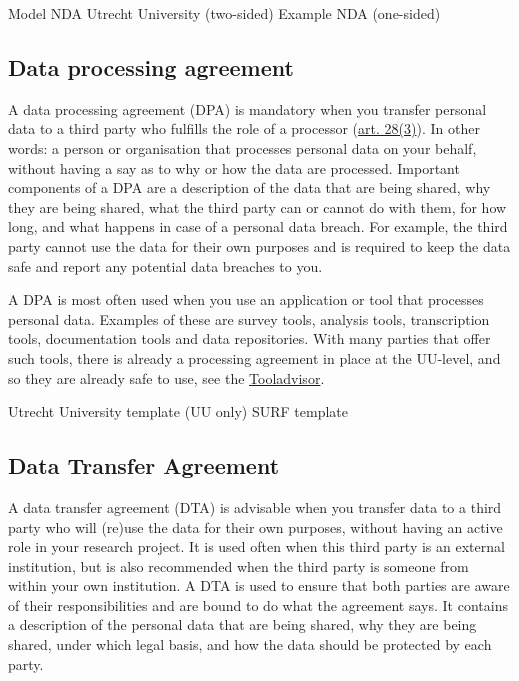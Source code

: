 \documentclass[
]{book}
\begin{document}
Model NDA Utrecht University (two-sided)
Example NDA (one-sided)

\hypertarget{data-processing-agreement}{%
\subsection{Data processing agreement}\label{data-processing-agreement}}

A data processing agreement (DPA) is mandatory when you transfer personal data
to a third party who fulfills the role of a processor
(\href{https://gdpr-info.eu/art-28-gdpr/}{art. 28(3)}).
In other words: a person or organisation that processes personal data on your
behalf, without having a say as to why or how the data are processed. Important
components of a DPA are a description of the data that are being shared, why
they are being shared, what the third party can or cannot do with them, for how
long, and what happens in case of a personal data breach. For example, the third
party cannot use the data for their own purposes and is required to keep the
data safe and report any potential data breaches to you.

A DPA is most often used when you use an application or tool that processes
personal data. Examples of these are survey tools, analysis tools, transcription
tools, documentation tools and data repositories. With many parties that offer
such tools, there is already a processing agreement in place at the UU-level,
and so they are already safe to use, see the
\href{https://tools.uu.nl/}{Tooladvisor}.

Utrecht University template (UU only)
SURF template

\hypertarget{data-transfer-agreement}{%
\subsection{Data Transfer Agreement}\label{data-transfer-agreement}}

A data transfer agreement (DTA) is advisable when you transfer data to a third
party who will (re)use the data for their own purposes, without having an
active role in your research project. It is used often when this third party is
an external institution, but is also recommended when the third party is someone
from within your own institution. A DTA is used to ensure that both parties are
aware of their responsibilities and are bound to do what the agreement says. It
contains a description of the personal data that are being shared, why they are
being shared, under which legal basis, and how the data should be protected by
each party.
\end{document}
